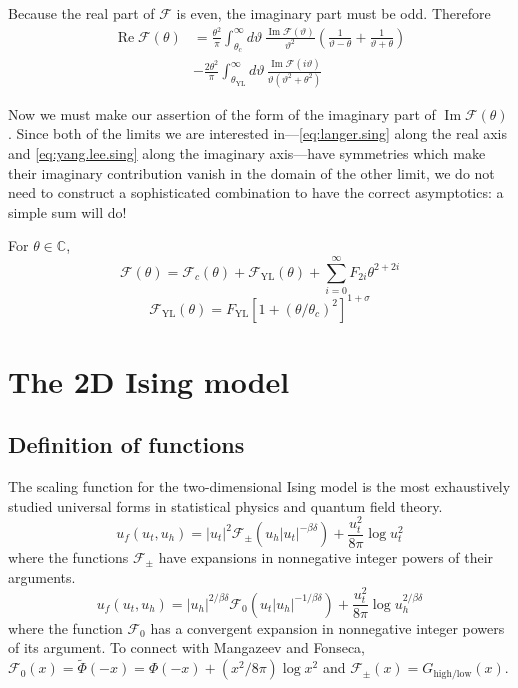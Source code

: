 \documentclass[
  aps,
  pre,
  reprint,
  longbibliography,
  floatfix
]{revtex4-2}
\begin{document}
Because the real part of $\mathcal F$ is even, the imaginary part must be odd. Therefore
\begin{equation}
  \begin{aligned}
    \operatorname{Re}\mathcal F(\theta)
    &=\frac{\theta^2}{\pi}
    \int_{\theta_c}^\infty d\vartheta\,\frac{\operatorname{Im}\mathcal F(\vartheta)}{\vartheta^2}\left(\frac1{\vartheta-\theta}+\frac1{\vartheta+\theta}\right) \\
    &-\frac{2\theta^2}\pi\int_{\theta_{\mathrm{YL}}}^{\infty}d\vartheta\,\frac{\operatorname{Im}\mathcal F(i\vartheta)}{\vartheta(\vartheta^2+\theta^2)}
  \end{aligned}
\end{equation}

Now we must make our assertion of the form of the imaginary part of $\operatorname{Im}\mathcal F(\theta)$. Since both of the limits we are interested in---\eqref{eq:langer.sing} along the real axis and \eqref{eq:yang.lee.sing} along the imaginary axis---have symmetries which make their imaginary contribution vanish in the domain of the other limit, we do not need to construct a sophisticated combination to have the correct asymptotics: a simple sum will do!

For $\theta\in\mathbb C$,
\begin{equation}
  \mathcal F(\theta)=\mathcal F_c(\theta)+\mathcal F_{\mathrm{YL}}(\theta)+\sum_{i=0}^\infty F_{2i}\theta^{2+2i}
\end{equation}
\begin{equation}
  \mathcal F_{\mathrm{YL}}(\theta)=F_{\mathrm{YL}}[1+(\theta/\theta_c)^2]^{1+\sigma}
\end{equation}

\section{The 2D Ising model}

\subsection{Definition of functions}

The scaling function for the two-dimensional Ising model is the most
exhaustively studied universal forms in statistical physics and quantum field
theory.
\begin{equation} \label{eq:free.energy.2d.low}
  u_f(u_t, u_h)
  = |u_t|^2\mathcal F_{\pm}(u_h|u_t|^{-\beta\delta})
    +\frac{u_t^2}{8\pi}\log u_t^2
\end{equation}
where the functions $\mathcal F_\pm$ have expansions in nonnegative integer powers of their arguments.
\begin{equation} \label{eq:free.energy.2d.mid}
  u_f(u_t, u_h)
  = |u_h|^{2/\beta\delta}\mathcal F_0(u_t|u_h|^{-1/\beta\delta})
    +\frac{u_t^2}{8\pi}\log u_h^{2/\beta\delta}
\end{equation}
where the function $\mathcal F_0$ has a convergent expansion in nonnegative integer powers of its argument.
To connect with Mangazeev and Fonseca, $\mathcal F_0(x)=\tilde\Phi(-x)=\Phi(-x)+(x^2/8\pi) \log x^2$ and $\mathcal F_\pm(x)=G_{\mathrm{high}/\mathrm{low}}(x)$.
\end{document}

